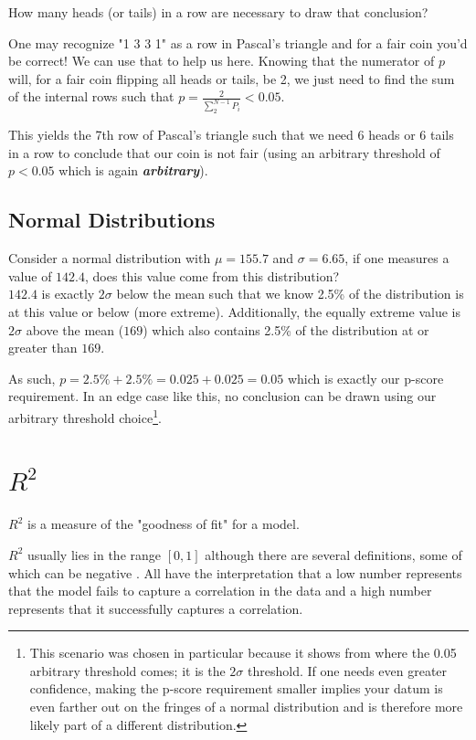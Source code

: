\documentclass[]{article}
\begin{document}
How many heads (or tails) in a row are necessary to draw that conclusion?

One may recognize "1 3 3 1" as a row in Pascal's triangle and for a fair coin you'd be correct! We can use that to help us here.
Knowing that the numerator of $p$ will, for a fair coin flipping all heads or tails, be 2, we just need to find the sum of the internal rows such that $p = \frac{2}{\sum_2^{N - 1} P_i} < 0.05$. 

This yields the 7th row of Pascal's triangle such that we need 6 heads or 6 tails in a row to conclude that our coin is not fair (using an arbitrary threshold of $p < 0.05$ which is again \textbf{\textit{arbitrary}}).

\subsection{Normal Distributions}
Consider a normal distribution with $\mu = 155.7$ and $\sigma = 6.65$, if one measures a value of $142.4$, does this value come from this distribution?\\

$142.4$ is exactly $2\sigma$ below the mean such that we know 2.5\% of the distribution is at this value or below (more extreme). Additionally, the equally extreme value is $2\sigma$ above the mean ($169$) which also contains 2.5\% of the distribution at or greater than $169$. 

As such, $p = 2.5\% + 2.5\% = 0.025 + 0.025 = 0.05$ which is exactly our p-score requirement. In an edge case like this, no conclusion can be drawn using our arbitrary threshold choice\footnote{This scenario was chosen in particular because it shows from where the 0.05 arbitrary threshold comes; it is the $2\sigma$ threshold. If one needs even greater confidence, making the p-score requirement smaller implies your datum is even farther out on the fringes of a normal distribution and is therefore more likely part of a different distribution.}.

\section{$R^2$}
\label{section_R-sq}
$R^2$ is a measure of the "goodness of fit" for a model.

$R^2$ usually lies in the range $[0, 1]$ although there are several definitions, some of which can be negative \cite{r2}. All have the interpretation that a low number represents that the model fails to capture a correlation in the data and a high number represents that it successfully captures a correlation.\\
\end{document}
